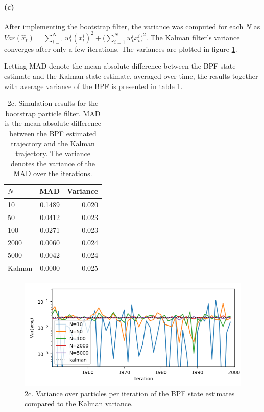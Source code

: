\documentclass{article}
\begin{document}
\paragraph{(c)} After implementing the bootstrap filter, the variance was computed for each $N$ as $Var(\hat{x}_t) = \sum_{i=1}^{N}w_t^i (x_t^i)^2 + \big(\sum_{i=1}^{N} w_t^i x_t^i \big)^2$. The Kalman filter's variance converges after only a few iterations. The variances are plotted in figure \ref{fig:2_c}.

Letting MAD denote the mean absolute difference between the BPF state estimate and the Kalman state estimate, averaged over time, the results together with average variance of the BPF is presented in table \ref{tab:2c}.
\begin{table}
	\caption{2c. Simulation results for the bootstrap particle filter. MAD is the mean absolute difference between the BPF estimated trajectory and the Kalman trajectory. The variance denotes the variance of the MAD over the iterations.}
	\label{tab:2c}
	\centering
	\begin{tabular}{lrr}\toprule
		$N$ & MAD 		& Variance 	\\\midrule
		10 	& 0.1489	& 0.020  	\\
		50	& 0.0412	& 0.023		\\
		100	& 0.0271	& 0.023		\\
		2000& 0.0060	& 0.024		\\
		5000& 0.0042 	& 0.024		\\
		Kalman & 0.0000 & 0.025		\\\bottomrule
	\end{tabular}
\end{table}

\begin{figure}[t]
	\centering
	\includegraphics[width=.7\linewidth]{2_c}
	\caption{2c. Variance over particles per iteration of the BPF state estimates compared to the Kalman variance.}
	\label{fig:2_c}
\end{figure}
\end{document}
